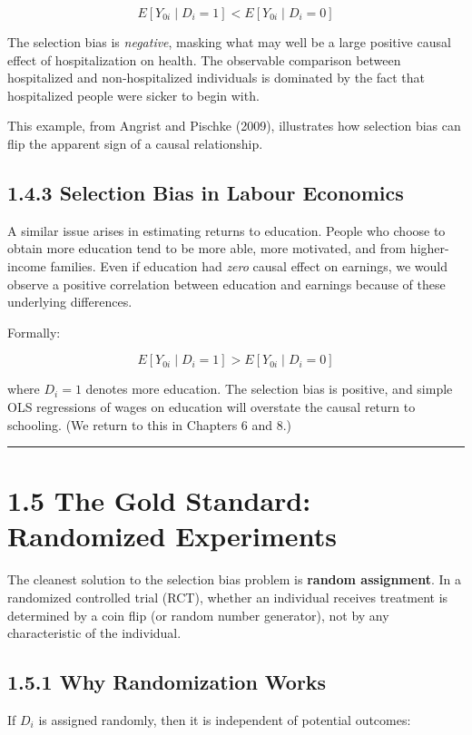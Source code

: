 \[
E[Y_{0i} \mid D_i = 1] < E[Y_{0i} \mid D_i = 0]
\]

The selection bias is \textit{negative}, masking what may well be a large positive causal effect of hospitalization on health. The observable comparison between hospitalized and non-hospitalized individuals is dominated by the fact that hospitalized people were sicker to begin with.

This example, from Angrist and Pischke (2009), illustrates how selection bias can flip the apparent sign of a causal relationship.

\subsection{1.4.3 Selection Bias in Labour Economics}

A similar issue arises in estimating returns to education. People who choose to obtain more education tend to be more able, more motivated, and from higher-income families. Even if education had \textit{zero} causal effect on earnings, we would observe a positive correlation between education and earnings because of these underlying differences.

Formally:

\[
E[Y_{0i} \mid D_i = 1] > E[Y_{0i} \mid D_i = 0]
\]

where $D_i = 1$ denotes more education. The selection bias is positive, and simple OLS regressions of wages on education will overstate the causal return to schooling. (We return to this in Chapters 6 and 8.)

\medskip\hrule\medskip

\section{1.5 The Gold Standard: Randomized Experiments}

The cleanest solution to the selection bias problem is \textbf{random assignment}. In a randomized controlled trial (RCT), whether an individual receives treatment is determined by a coin flip (or random number generator), not by any characteristic of the individual.

\subsection{1.5.1 Why Randomization Works}

If $D_i$ is assigned randomly, then it is independent of potential outcomes:


